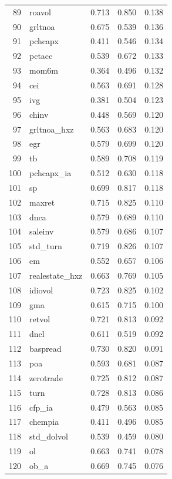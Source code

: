 \begin{footnotesize}
\begin{longtable}{rl|c|c|c}
		89 & roavol & 0.713 & 0.850 & 0.138 \\ 
		90 & grltnoa & 0.675 & 0.539 & 0.136 \\ 
		91 & pchcapx & 0.411 & 0.546 & 0.134 \\ 
		92 & pctacc & 0.539 & 0.672 & 0.133 \\ 
		93 & mom6m & 0.364 & 0.496 & 0.132 \\ 
		94 & cei & 0.563 & 0.691 & 0.128 \\ 
		95 & ivg & 0.381 & 0.504 & 0.123 \\ 
		96 & chinv & 0.448 & 0.569 & 0.120 \\ 
		97 & grltnoa\_hxz & 0.563 & 0.683 & 0.120 \\ 
		98 & egr & 0.579 & 0.699 & 0.120 \\ 
		99 & tb & 0.589 & 0.708 & 0.119 \\ 
		100 & pchcapx\_ia & 0.512 & 0.630 & 0.118 \\ 
		101 & sp & 0.699 & 0.817 & 0.118 \\ 
		102 & maxret & 0.715 & 0.825 & 0.110 \\ 
		103 & dnca & 0.579 & 0.689 & 0.110 \\ 
		104 & saleinv & 0.579 & 0.686 & 0.107 \\ 
		105 & std\_turn & 0.719 & 0.826 & 0.107 \\ 
		106 & em & 0.552 & 0.657 & 0.106 \\ 
		107 & realestate\_hxz & 0.663 & 0.769 & 0.105 \\ 
		108 & idiovol & 0.723 & 0.825 & 0.102 \\ 
		109 & gma & 0.615 & 0.715 & 0.100 \\ 
		110 & retvol & 0.721 & 0.813 & 0.092 \\ 
		111 & dncl & 0.611 & 0.519 & 0.092 \\ 
		112 & baspread & 0.730 & 0.820 & 0.091 \\ 
		113 & poa & 0.593 & 0.681 & 0.087 \\ 
		114 & zerotrade & 0.725 & 0.812 & 0.087 \\ 
		115 & turn & 0.728 & 0.813 & 0.086 \\ 
		116 & cfp\_ia & 0.479 & 0.563 & 0.085 \\ 
		117 & chempia & 0.411 & 0.496 & 0.085 \\ 
		118 & std\_dolvol & 0.539 & 0.459 & 0.080 \\ 
		119 & ol & 0.663 & 0.741 & 0.078 \\ 
		120 & ob\_a & 0.669 & 0.745 & 0.076 \\ 

\end{longtable}
\end{footnotesize}
